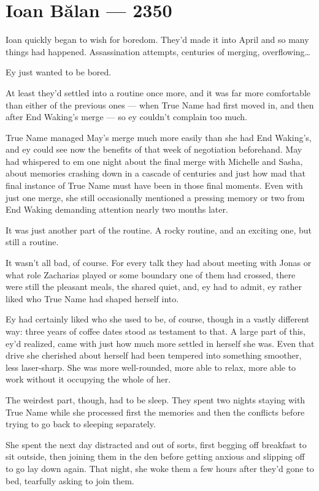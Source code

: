 \hypertarget{ioan-bux103lan-2350}{%
\chapter{Ioan Bălan — 2350}\label{ioan-bux103lan-2350}}

Ioan quickly began to wish for boredom. They'd made it into April and so many things had happened. Assassination attempts, centuries of merging, overflowing\ldots{}

Ey just wanted to be bored.

At least they'd settled into a routine once more, and it was far more comfortable than either of the previous ones — when True Name had first moved in, and then after End Waking's merge — so ey couldn't complain too much.

True Name managed May's merge much more easily than she had End Waking's, and ey could see now the benefits of that week of negotiation beforehand. May had whispered to em one night about the final merge with Michelle and Sasha, about memories crashing down in a cascade of centuries and just how mad that final instance of True Name must have been in those final moments. Even with just one merge, she still occasionally mentioned a pressing memory or two from End Waking demanding attention nearly two months later.

It was just another part of the routine. A rocky routine, and an exciting one, but still a routine.

It wasn't all bad, of course. For every talk they had about meeting with Jonas or what role Zacharias played or some boundary one of them had crossed, there were still the pleasant meals, the shared quiet, and, ey had to admit, ey rather liked who True Name had shaped herself into.

Ey had certainly liked who she used to be, of course, though in a vastly different way: three years of coffee dates stood as testament to that. A large part of this, ey'd realized, came with just how much more settled in herself she was. Even that drive she cherished about herself had been tempered into something smoother, less laser-sharp. She was more well-rounded, more able to relax, more able to work without it occupying the whole of her.

The weirdest part, though, had to be sleep. They spent two nights staying with True Name while she processed first the memories and then the conflicts before trying to go back to sleeping separately.

She spent the next day distracted and out of sorts, first begging off breakfast to sit outside, then joining them in the den before getting anxious and slipping off to go lay down again. That night, she woke them a few hours after they'd gone to bed, tearfully asking to join them.

